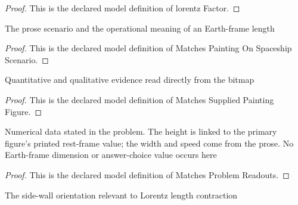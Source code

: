 \begin{proof}
  This is the declared model definition of lorentz Factor.
\end{proof}
\begin{definition}
  \label{def:physics:phyx-mini-0622:phyxminiproblems-problemphyxmini0622-matchespaintingonspaceshipscenario}
  The prose scenario and the operational meaning of an Earth-frame length
\end{definition}
\begin{proof}
  This is the declared model definition of Matches Painting On Spaceship Scenario.
\end{proof}
\begin{definition}
  \label{def:physics:phyx-mini-0622:phyxminiproblems-problemphyxmini0622-matchessuppliedpaintingfigure}
  Quantitative and qualitative evidence read directly from the bitmap
\end{definition}
\begin{proof}
  This is the declared model definition of Matches Supplied Painting Figure.
\end{proof}
\begin{definition}
  \label{def:physics:phyx-mini-0622:phyxminiproblems-problemphyxmini0622-matchesproblemreadouts}
  Numerical data stated in the problem. The height is linked to the primary figure's printed rest-frame value; the width and speed come from the prose. No Earth-frame dimension or answer-choice value occurs here
\end{definition}
\begin{proof}
  This is the declared model definition of Matches Problem Readouts.
\end{proof}
\begin{definition}
  \label{def:physics:phyx-mini-0622:phyxminiproblems-problemphyxmini0622-matchessidewallmotiongeometry}
  The side-wall orientation relevant to Lorentz length contraction
\end{definition}
